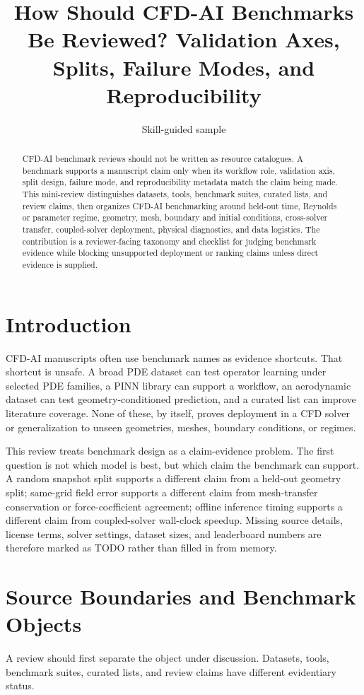 \documentclass[11pt]{article}
\title{How Should CFD-AI Benchmarks Be Reviewed? Validation Axes, Splits, Failure Modes, and Reproducibility}
\author{Skill-guided sample}
\date{}
\begin{document}
\maketitle

\begin{abstract}
CFD-AI benchmark reviews should not be written as resource catalogues. A benchmark supports a manuscript claim only when its workflow role, validation axis, split design, failure mode, and reproducibility metadata match the claim being made. This mini-review distinguishes datasets, tools, benchmark suites, curated lists, and review claims, then organizes CFD-AI benchmarking around held-out time, Reynolds or parameter regime, geometry, mesh, boundary and initial conditions, cross-solver transfer, coupled-solver deployment, physical diagnostics, and data logistics. The contribution is a reviewer-facing taxonomy and checklist for judging benchmark evidence while blocking unsupported deployment or ranking claims unless direct evidence is supplied.
\end{abstract}

\section{Introduction}
CFD-AI manuscripts often use benchmark names as evidence shortcuts. That shortcut is unsafe. A broad PDE dataset can test operator learning under selected PDE families, a PINN library can support a workflow, an aerodynamic dataset can test geometry-conditioned prediction, and a curated list can improve literature coverage. None of these, by itself, proves deployment in a CFD solver or generalization to unseen geometries, meshes, boundary conditions, or regimes.

This review treats benchmark design as a claim-evidence problem. The first question is not which model is best, but which claim the benchmark can support. A random snapshot split supports a different claim from a held-out geometry split; same-grid field error supports a different claim from mesh-transfer conservation or force-coefficient agreement; offline inference timing supports a different claim from coupled-solver wall-clock speedup. Missing source details, license terms, solver settings, dataset sizes, and leaderboard numbers are therefore marked as TODO rather than filled in from memory.

\section{Source Boundaries and Benchmark Objects}
A review should first separate the object under discussion. Datasets, tools, benchmark suites, curated lists, and review claims have different evidentiary status.
\end{document}

